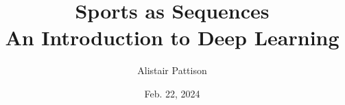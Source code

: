 \documentclass{beamer}
\title{{Sports as Sequences} \\ \small An Introduction to Deep Learning}
\author{Alistair Pattison}
\date{Feb. 22, 2024}
\begin{document}
\begin{frame}
	\titlepage
\end{frame}





\end{document}
